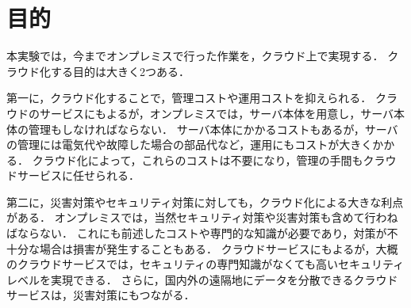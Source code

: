 \section{目的}
本実験では，今までオンプレミスで行った作業を，クラウド上で実現する．
クラウド化する目的は大きく2つある．\par
第一に，クラウド化することで，管理コストや運用コストを抑えられる．
クラウドのサービスにもよるが，オンプレミスでは，サーバ本体を用意し，サーバ本体の管理もしなければならない．
サーバ本体にかかるコストもあるが，サーバの管理には電気代や故障した場合の部品代など，運用にもコストが大きくかかる．
クラウド化によって，これらのコストは不要になり，管理の手間もクラウドサービスに任せられる．\par
第二に，災害対策やセキュリティ対策に対しても，クラウド化による大きな利点がある．
オンプレミスでは，当然セキュリティ対策や災害対策も含めて行わねばならない．
これにも前述したコストや専門的な知識が必要であり，対策が不十分な場合は損害が発生することもある．
クラウドサービスにもよるが，大概のクラウドサービスでは，セキュリティの専門知識がなくても高いセキュリティレベルを実現できる．
さらに，国内外の遠隔地にデータを分散できるクラウドサービスは，災害対策にもつながる．\par
